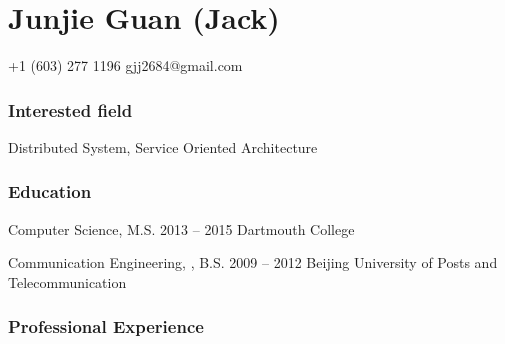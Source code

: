 \documentclass{tccv}
\begin{document}
\part{Junjie Guan (Jack)}

\begin{multicols}{2}

    {+1 (603) 277 1196}
    {gjj2684@gmail.com}

\section{Interested field}
Distributed System, Service Oriented Architecture


\section{Education}

\begin{yearlist}

\item[Computer Science, M.S.]{2013 -- 2015}
     {Dartmouth College}

\item[Communication Engineering, , B.S.]{2009 -- 2012}
     {Beijing University of Posts and Telecommunication}

\end{yearlist}

\end{multicols}















\section{Professional Experience}
\end{document}

